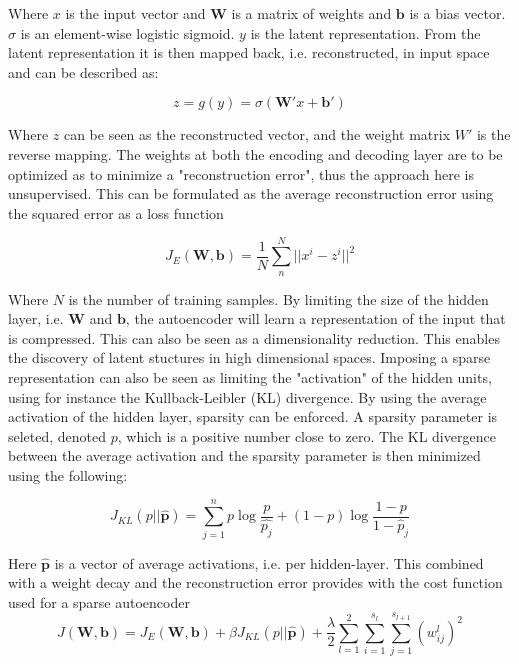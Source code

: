 \documentclass{article}
\begin{document}
Where $x$ is the input vector and $\mathbf{W}$ is a matrix of weights and $\mathbf{b}$ is a bias vector. $\sigma$ is an element-wise logistic sigmoid. $y$ is the latent representation. From the latent representation it is then mapped back, i.e. reconstructed, in input space and can be described as:

\begin{equation}
z = g(y) = \sigma(\mathbf{W'}x + \mathbf{b'})
\end{equation}

Where $z$ can be seen as the reconstructed vector, and the weight matrix $W'$ is the reverse mapping. The weights at both the encoding and decoding layer are to be optimized as to minimize a "reconstruction error", thus the approach here is unsupervised. This can be formulated as the average reconstruction error using the squared error as a loss function

\begin{equation}
J_E(\mathbf{W},\mathbf{b}) = \frac{1}{N} \sum_n^N || x^i - z^i || ^2
\end{equation}

Where $N$ is the number of training samples. By limiting the size of the hidden layer, i.e. $\mathbf{W}$ and $\mathbf{b}$, the autoencoder will learn a representation of the input that is compressed. This can also be seen as a dimensionality reduction. This enables the discovery of latent stuctures in high dimensional spaces. 
Imposing a sparse representation can also be seen as limiting the "activation" of the hidden units, using for instance the Kullback-Leibler (KL) divergence. By using the average activation of the hidden layer, sparsity can be enforced. A sparsity parameter is seleted, denoted $p$, which is a positive number close to zero. The KL divergence between the average activation and the sparsity parameter is then minimized using the following:

\begin{equation}
  J_{KL}(p || \hat{\mathbf{p}}) = \sum_{j=1}^n p \log\frac{p}{\hat{p_{j}}} + (1-p) \log\frac{1-p}{1-\hat{p}_j}
\end{equation} \label{eq:sparse}

Here $\hat{\mathbf{p}}$ is a vector of average activations, i.e. per hidden-layer. This combined with a weight decay and the reconstruction error provides with the cost function used for a sparse autoencoder \cite{Hosseini-Asl2016}
\begin{equation}\label{eq:lossfunc}
J(\mathbf{W},\mathbf{b}) = J_E(\mathbf{W},\mathbf{b}) + \beta J_{KL}(p || \hat{\mathbf{p}}) + \frac{\lambda}{2}\sum_{l=1}^2\sum_{i=1}^{s_l}\sum_{j=1}^{s_{l+1}} (w_{ij}^{l})^2
\end{equation}
\end{document}
